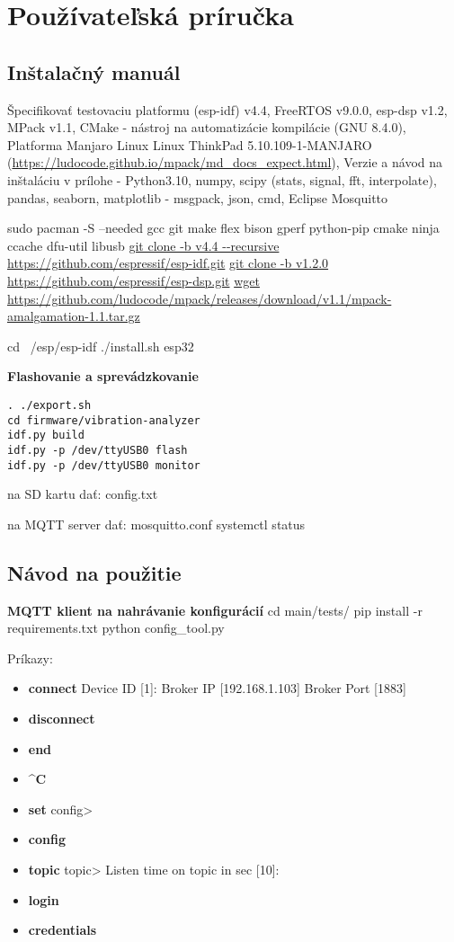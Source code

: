  \thispagestyle{empty}
\setcounter{figure}{0}
\chapter{Používateľská príručka}
\renewcommand*{\thepage}{C-\arabic{page}}

\section{Inštalačný manuál}
Špecifikovať testovaciu platformu
(esp-idf) v4.4, FreeRTOS v9.0.0, esp-dsp v1.2, MPack v1.1, CMake - nástroj na automatizácie kompilácie (GNU 8.4.0), Platforma Manjaro Linux
	Linux ThinkPad 5.10.109-1-MANJARO (\url{https://ludocode.github.io/mpack/md_docs_expect.html}), Verzie a návod na inštaláciu v prílohe
- Python3.10, numpy, scipy (stats, signal, fft, interpolate), pandas, seaborn, matplotlib
- msgpack, json, cmd,  Eclipse Mosquitto

sudo pacman -S --needed gcc git make flex bison gperf python-pip cmake ninja ccache dfu-util libusb
\url{git clone -b v4.4 --recursive https://github.com/espressif/esp-idf.git}
\url{git clone -b v1.2.0 https://github.com/espressif/esp-dsp.git}
\url{wget https://github.com/ludocode/mpack/releases/download/v1.1/mpack-amalgamation-1.1.tar.gz}


cd ~/esp/esp-idf
./install.sh esp32


\textbf{Flashovanie a sprevádzkovanie}
\begin{lstlisting}[style=messages]
. ./export.sh
cd firmware/vibration-analyzer
idf.py build
idf.py -p /dev/ttyUSB0 flash
idf.py -p /dev/ttyUSB0 monitor
\end{lstlisting}

na SD kartu dať: config.txt

na MQTT server dať: mosquitto.conf
systemctl status


\section{Návod na použitie}
\textbf{MQTT klient na nahrávanie konfigurácií}
cd  main/tests/
pip install -r requirements.txt
python config\_tool.py

Príkazy:
\begin{itemize}[noitemsep, topsep=0pt]
	\item \textbf{connect}
		Device ID [1]:
      	Broker IP [192.168.1.103]
        Broker Port [1883]
	\item \textbf{disconnect}
	\item \textbf{end}
	\item \textbf{^C}
	\item \textbf{set}
		config>
	\item \textbf{config}
	\item \textbf{topic}
		topic>
		Listen time on topic in sec [10]:
	\item \textbf{login}
	\item \textbf{credentials}
\end{itemize}

